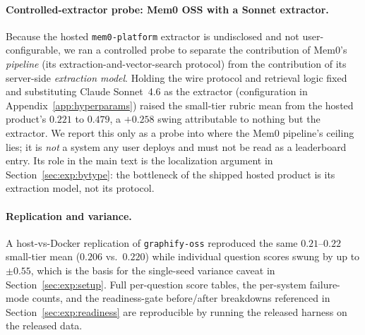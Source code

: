 \documentclass[11pt]{article}
\begin{document}
\paragraph{Controlled-extractor probe: Mem0 OSS with a Sonnet extractor.}
Because the hosted \texttt{mem0-platform} extractor is undisclosed and not
user-configurable, we ran a controlled probe to separate the contribution of
Mem0's \emph{pipeline} (its extraction-and-vector-search protocol) from the
contribution of its server-side \emph{extraction model}. Holding the wire
protocol and retrieval logic fixed and substituting Claude Sonnet~4.6 as the
extractor (configuration in Appendix~\ref{app:hyperparams}) raised the small-tier
rubric mean from the hosted product's $0.221$ to $0.479$, a $+0.258$ swing
attributable to nothing but the extractor. We report this only as a probe into
where the Mem0 pipeline's ceiling lies; it is \emph{not} a system any user
deploys and must not be read as a leaderboard entry. Its role in the main text is
the localization argument in Section~\ref{sec:exp:bytype}: the bottleneck of the
shipped hosted product is its extraction model, not its protocol.

\paragraph{Replication and variance.}
A host-vs-Docker replication of \texttt{graphify-oss} reproduced the same
$0.21$--$0.22$ small-tier mean ($0.206$ vs.\ $0.220$) while individual question
scores swung by up to $\pm0.55$, which is the basis for the single-seed variance
caveat in Section~\ref{sec:exp:setup}. Full per-question score tables, the
per-system failure-mode counts, and the readiness-gate before/after breakdowns
referenced in Section~\ref{sec:exp:readiness} are reproducible by running the
released harness on the released data.



\end{document}
